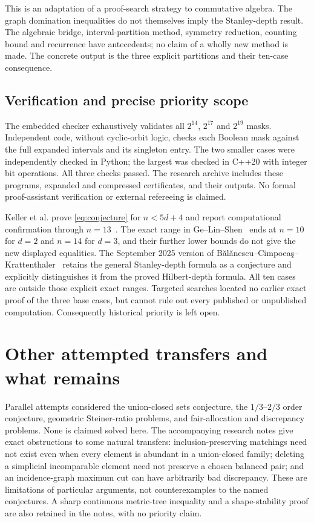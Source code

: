 \documentclass[11pt,a4paper]{article}
\begin{document}
This is an adaptation of a proof-search strategy to commutative algebra.
The graph domination inequalities do not themselves imply the Stanley-depth
result. The algebraic bridge, interval-partition method, symmetry reduction,
counting bound and recurrence have antecedents; no claim of a wholly new
method is made. The concrete output is the three explicit partitions and
their ten-case consequence.

\subsection{Verification and precise priority scope}
The embedded checker exhaustively validates all $2^{14}$, $2^{17}$ and
$2^{19}$ masks. Independent code, without cyclic-orbit logic, checks each
Boolean mask against the full expanded intervals and its singleton entry.
The two smaller cases were independently checked in Python; the largest
was checked in C++20 with integer bit operations. All three checks passed.
The research archive includes these programs, expanded and compressed
certificates, and their outputs. No formal proof-assistant verification
or external refereeing is claimed.

Keller et al. prove \eqref{eq:conjecture} for $n<5d+4$ and report
computational confirmation through $n=13$~\cite{KSSY}.
The exact range in Ge--Lin--Shen~\cite{GLS} ends at $n=10$ for $d=2$
and $n=14$ for $d=3$, and their further lower bounds do not give the
new displayed equalities. The September 2025 version of
B\u{a}l\u{a}nescu--Cimpoea\c{s}--Krattenthaler~\cite[Remark~3.11]{BCK}
retains the general Stanley-depth formula as a conjecture and explicitly
distinguishes it from the proved Hilbert-depth formula.
All ten cases are outside those explicit exact ranges. Targeted searches
located no earlier exact proof of the three base cases, but cannot rule
out every published or unpublished computation. Consequently historical
priority is left open.

\section{Other attempted transfers and what remains}
Parallel attempts considered the union-closed sets conjecture,
the $1/3$--$2/3$ order conjecture, geometric Steiner-ratio problems,
and fair-allocation and discrepancy problems. None is claimed solved
here. The accompanying research notes give exact obstructions to some
natural transfers: inclusion-preserving matchings need not exist even
when every element is abundant in a union-closed family; deleting a
simplicial incomparable element need not preserve a chosen balanced pair;
and an incidence-graph maximum cut can have arbitrarily bad discrepancy.
These are limitations of particular arguments, not counterexamples to
the named conjectures. A sharp continuous metric-tree inequality and a
shape-stability proof are also retained in the notes, with no priority claim.
\end{document}
